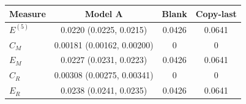 \begin{tabular}{lccc}
\toprule
Measure & Model A & Blank & Copy-last \\
\midrule
$E^{(5)}$ & 0.0220 (0.0225, 0.0215) & 0.0426 & 0.0641 \\
$C_M$ & 0.00181 (0.00162, 0.00200) & 0 & 0 \\
$E_M$ & 0.0227 (0.0231, 0.0223) & 0.0426 & 0.0641 \\
$C_R$ & 0.00308 (0.00275, 0.00341) & 0 & 0 \\
$E_R$ & 0.0238 (0.0241, 0.0235) & 0.0426 & 0.0641 \\
\bottomrule
\end{tabular}
